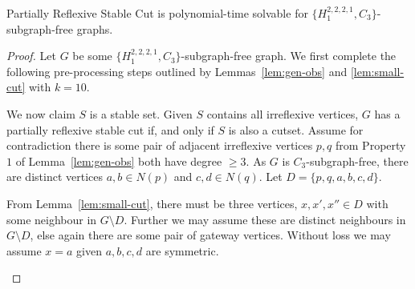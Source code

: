 \documentclass[a4paper,UKenglish,cleveref, autoref,thm-restate]{lipics-v2021}
\begin{document}
\begin{theorem}
{\sc Partially Reflexive Stable Cut} is polynomial-time solvable for $\{H_1^{2,2,2,1}, C_3\}$-subgraph-free graphs.
\label{thm:tala-H2221}
\end{theorem}
\begin{proof}
Let $G$ be some  $\{H_1^{2,2,2,1}, C_3\}$-subgraph-free graph. We first complete the following pre-processing steps outlined by Lemmas~\ref{lem:gen-obs} and \ref{lem:small-cut} with $k=10$.

We now claim $S$ is a stable set. Given $S$ contains all irreflexive vertices, $G$ has a partially reflexive stable cut if, and only if $S$ is also a cutset. Assume for contradiction there is some pair of adjacent irreflexive vertices $p,q$ from Property $1$ of Lemma~\ref{lem:gen-obs} both have degree $\geq 3$. As $G$ is $C_3$-subgraph-free, there are distinct vertices $a,b \in N(p)$ and $c,d \in N(q)$. Let $D=\{p,q,a,b,c,d\}$.

From Lemma~\ref{lem:small-cut}, there must be three vertices, $x,x',x'' \in D$ with some neighbour in $G \setminus D$. Further we may assume these are distinct neighbours in $G \setminus D$, else again there are some pair of gateway vertices. Without loss we may assume $x = a$ given $a,b,c,d$ are symmetric.

\begin{figure}
    \centering
\end{figure}
\end{proof}
\end{document}
